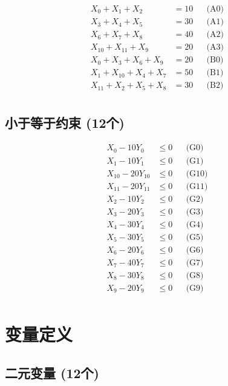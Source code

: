 \documentclass[a4paper,10pt]{article}
\begin{document}
\allowdisplaybreaks
{\small\begin{align}
X_{0} + X_{1} + X_{2} &= 10 && \text{(A0)} \\
X_{3} + X_{4} + X_{5} &= 30 && \text{(A1)} \\
X_{6} + X_{7} + X_{8} &= 40 && \text{(A2)} \\
X_{10} + X_{11} + X_{9} &= 20 && \text{(A3)} \\
X_{0} + X_{3} + X_{6} + X_{9} &= 20 && \text{(B0)} \\
X_{1} + X_{10} + X_{4} + X_{7} &= 50 && \text{(B1)} \\
X_{11} + X_{2} + X_{5} + X_{8} &= 30 && \text{(B2)} \\
\end{align}}

\subsection{小于等于约束 (12个)}

\allowdisplaybreaks
{\small\begin{align}
X_{0} - 10Y_{0} &\leq 0 && \text{(G0)} \\
X_{1} - 10Y_{1} &\leq 0 && \text{(G1)} \\
X_{10} - 20Y_{10} &\leq 0 && \text{(G10)} \\
X_{11} - 20Y_{11} &\leq 0 && \text{(G11)} \\
X_{2} - 10Y_{2} &\leq 0 && \text{(G2)} \\
X_{3} - 20Y_{3} &\leq 0 && \text{(G3)} \\
X_{4} - 30Y_{4} &\leq 0 && \text{(G4)} \\
X_{5} - 30Y_{5} &\leq 0 && \text{(G5)} \\
X_{6} - 20Y_{6} &\leq 0 && \text{(G6)} \\
X_{7} - 40Y_{7} &\leq 0 && \text{(G7)} \\
X_{8} - 30Y_{8} &\leq 0 && \text{(G8)} \\
X_{9} - 20Y_{9} &\leq 0 && \text{(G9)} \\
\end{align}}

\section{变量定义}

\subsection{二元变量 (12个)}
\end{document}
